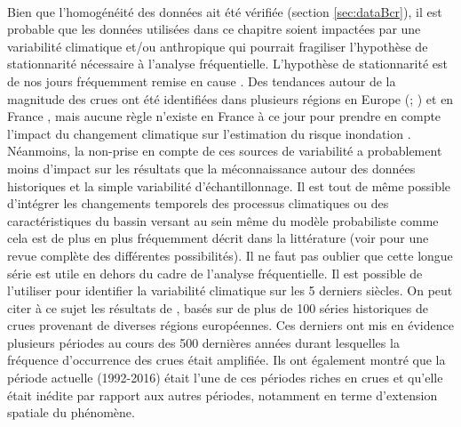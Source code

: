	\paragraph{} Bien que l'homogénéité des données ait été vérifiée (section \ref{sec:dataBcr}), il est probable que les données utilisées dans ce chapitre soient impactées par une variabilité climatique et/ou anthropique qui pourrait fragiliser l'hypothèse de stationnarité nécessaire à l'analyse fréquentielle. L'hypothèse de stationnarité est de nos jours fréquemment remise en cause \citep{milly_stationarity_2008}. Des tendances autour de la magnitude des crues ont été identifiées dans plusieurs régions en Europe (\cite{hall_understanding_2014}; \cite{bloschl_changing_2019}) et en France \citet{giuntoli_floods_2019}, mais aucune règle n'existe en France à ce jour pour prendre en compte l'impact du changement climatique sur l'estimation du risque inondation \citet{madsen_review_2014}. Néanmoins, la non-prise en compte de ces sources de variabilité a probablement moins d'impact sur les résultats que la méconnaissance autour des données historiques et la simple variabilité d'échantillonnage. Il est tout de même possible d'intégrer les changements temporels des processus climatiques ou des caractéristiques du bassin versant au sein même du modèle probabiliste comme cela est de plus en plus fréquemment décrit dans la littérature (voir \citet{salas_techniques_2018} pour une revue complète des différentes possibilités). Il ne faut pas oublier que cette longue série est utile en dehors du cadre de l'analyse fréquentielle. Il est possible de l'utiliser pour identifier la variabilité climatique sur les 5 derniers siècles. On peut citer à ce sujet les résultats de \citet{bloschl_current_2020}, basés sur de plus de 100 séries historiques de crues provenant de diverses régions européennes. Ces derniers ont mis en évidence plusieurs périodes au cours des 500 dernières années durant lesquelles la fréquence d'occurrence des crues était amplifiée. Ils ont également montré que la période actuelle (1992-2016) était l'une de ces périodes riches en crues et qu'elle était inédite par rapport aux autres périodes, notamment en terme d'extension spatiale du phénomène. 
	
	
